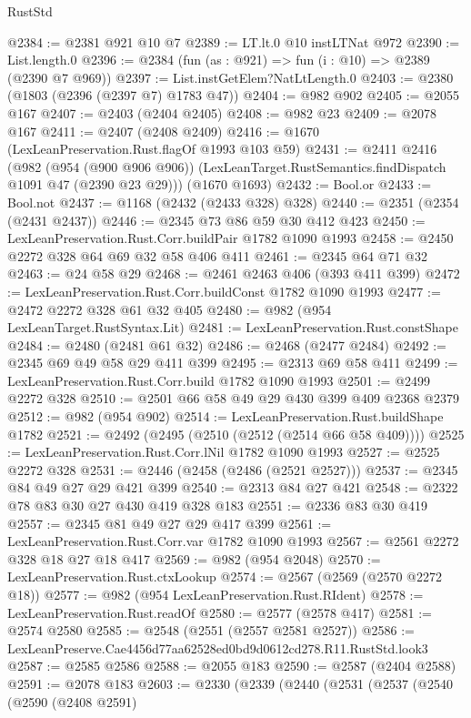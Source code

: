 \begin{lexlean}{RustStd}
\begin{coremodule}
@2384 := @2381 @921 @10 @7
@2389 := LT.lt.{0} @10 instLTNat @972
@2390 := List.length.{0}
@2396 := @2384 (fun (as : @921) => fun (i : @10) => @2389 (@2390 @7 @969))
@2397 := List.instGetElem?NatLtLength.{0}
@2403 := @2380 (@1803 (@2396 (@2397 @7) @1783 @47))
@2404 := @982 @902
@2405 := @2055 @167
@2407 := @2403 (@2404 @2405)
@2408 := @982 @23
@2409 := @2078 @167
@2411 := @2407 (@2408 @2409)
@2416 := @1670 (LexLeanPreservation.Rust.flagOf @1993 @103 @59)
@2431 := @2411
    @2416
    (@982
      (@954 (@900 @906 @906))
      (LexLeanTarget.RustSemantics.findDispatch @1091 @47 (@2390 @23 @29)))
    (@1670 @1693)
@2432 := Bool.or
@2433 := Bool.not
@2437 := @1168 (@2432 (@2433 @328) @328)
@2440 := @2351 (@2354 (@2431 @2437))
@2446 := @2345 @73 @86 @59 @30 @412 @423
@2450 := LexLeanPreservation.Rust.Corr.buildPair @1782 @1090 @1993
@2458 := @2450 @2272 @328 @64 @69 @32 @58 @406 @411
@2461 := @2345 @64 @71 @32
@2463 := @24 @58 @29
@2468 := @2461 @2463 @406 (@393 @411 @399)
@2472 := LexLeanPreservation.Rust.Corr.buildConst @1782 @1090 @1993
@2477 := @2472 @2272 @328 @61 @32 @405
@2480 := @982 (@954 LexLeanTarget.RustSyntax.Lit)
@2481 := LexLeanPreservation.Rust.constShape
@2484 := @2480 (@2481 @61 @32)
@2486 := @2468 (@2477 @2484)
@2492 := @2345 @69 @49 @58 @29 @411 @399
@2495 := @2313 @69 @58 @411
@2499 := LexLeanPreservation.Rust.Corr.build @1782 @1090 @1993
@2501 := @2499 @2272 @328
@2510 := @2501 @66 @58 @49 @29 @430 @399 @409 @2368 @2379
@2512 := @982 (@954 @902)
@2514 := LexLeanPreservation.Rust.buildShape @1782
@2521 := @2492 (@2495 (@2510 (@2512 (@2514 @66 @58 @409))))
@2525 := LexLeanPreservation.Rust.Corr.lNil @1782 @1090 @1993
@2527 := @2525 @2272 @328
@2531 := @2446 (@2458 (@2486 (@2521 @2527)))
@2537 := @2345 @84 @49 @27 @29 @421 @399
@2540 := @2313 @84 @27 @421
@2548 := @2322 @78 @83 @30 @27 @430 @419 @328 @183
@2551 := @2336 @83 @30 @419
@2557 := @2345 @81 @49 @27 @29 @417 @399
@2561 := LexLeanPreservation.Rust.Corr.var @1782 @1090 @1993
@2567 := @2561 @2272 @328 @18 @27 @18 @417
@2569 := @982 (@954 @2048)
@2570 := LexLeanPreservation.Rust.ctxLookup
@2574 := @2567 (@2569 (@2570 @2272 @18))
@2577 := @982 (@954 LexLeanPreservation.Rust.RIdent)
@2578 := LexLeanPreservation.Rust.readOf
@2580 := @2577 (@2578 @417)
@2581 := @2574 @2580
@2585 := @2548 (@2551 (@2557 @2581 @2527))
@2586 := LexLeanPreserve.Cae4456d77aa62528ed0bd9d0612cd278.R11.RustStd.look3
@2587 := @2585 @2586
@2588 := @2055 @183
@2590 := @2587 (@2404 @2588)
@2591 := @2078 @183
@2603 := @2330
    (@2339
      (@2440
        (@2531
          (@2537
            (@2540
              (@2590
                (@2408 @2591)

\end{coremodule}
\end{lexlean}
